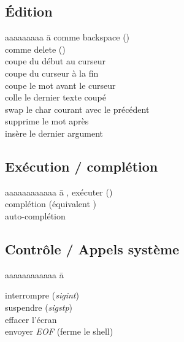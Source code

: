 \documentclass{article}
\let\oldkeys\keys
\renewcommand{\keys}[1]{\small\oldkeys{#1}\normalsize}
\begin{document}
\begin{multicols}{4}
    \subsection*{Édition}

    \begin{tabbing}
        aaaaaaaaa \= a \kill
         \> comme backspace (\keys{\backspace})    \\
         \> comme delete (\keys{\del})             \\
         \> coupe du début au curseur              \\
         \> coupe du curseur à la fin              \\
         \> coupe le mot avant le curseur          \\
         \> colle le dernier texte coupé           \\
         \> swap le char courant avec le précédent \\
          \> supprime le mot après                  \\
          \> insère le dernier argument
    \end{tabbing}

    \subsection*{Exécution / complétion}

    \begin{tabbing}
        aaaaaaaaaaaa \= a \kill
        ,  exécuter (\keys{\return}) \\
         \> complétion (équivalent \keys{\tab})                           \\
        \keys{\tab}{}    \> auto-complétion
    \end{tabbing}

    \subsection*{Contrôle / Appels système}

    \begin{tabbing}
        aaaaaaaaaaaa \= a \kill

         \> interrompre (\emph{sigint})         \\
         \> suspendre (\emph{sigstp})           \\
         \> effacer l'écran                     \\
         \> envoyer \emph{EOF} (ferme le shell)
    \end{tabbing}




\end{multicols}
\end{document}
